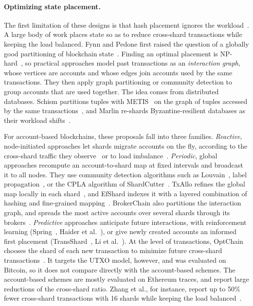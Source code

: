 \paragraph{Optimizing state placement.}
The first limitation of these designs is that hash placement ignores the workload~\cite{krol2021shard}.
A large body of work places state so as to reduce cross-shard transactions while keeping the load balanced.
Fynn and Pedone first raised the question of a globally good partitioning of blockchain state~\cite{fynn2018challenges}.
Finding an optimal placement is NP-hard~\cite{mizrahi2020blockchain}, so practical approaches model past transactions as an \emph{interaction graph}, whose vertices are accounts and whose edges join accounts used by the same transactions.
They then apply graph partitioning or community detection to group accounts that are used together.
The idea comes from distributed databases.
Schism partitions tuples with METIS~\cite{karypis1998fast} on the graph of tuples accessed by the same transactions~\cite{curino2010schism}, and Marlin re-shards Byzantine-resilient databases as their workload shifts~\cite{mehta2025adaptive}.

For account-based blockchains, these proposals fall into three families.
\emph{Reactive}, node-initiated approaches let shards migrate accounts on the fly, according to the cross-shard traffic they observe~\cite{mizrahi2020blockchain,krol2021shard} or to load imbalance~\cite{toulouse2022distributed}.
\emph{Periodic}, global approaches recompute an account-to-shard map at fixed intervals and broadcast it to all nodes.
They use community detection algorithms such as Louvain~\cite{blondel2008fast,zhang2022community}, label propagation~\cite{li2022achieving}, or the CPLA algorithm of ShardCutter~\cite{huang2026shardcutter}.
TxAllo refines the global map locally in each shard~\cite{txallo}, and EfShard indexes it with a layered combination of hashing and fine-grained mapping~\cite{efShard}.
BrokerChain also partitions the interaction graph, and spreads the most active accounts over several shards through its brokers~\cite{huang2022brokerchain}.
\emph{Predictive} approaches anticipate future interactions, with reinforcement learning (Spring~\cite{li2024spring}, Haider et al.~\cite{haider2025ai}), or give newly created accounts an informed first placement (TransShard~\cite{wang2024transshard}, Li et al.~\cite{li2025novel}).
At the level of transactions, OptChain chooses the shard of each new transaction to minimize future cross-shard transactions~\cite{Nguyen2019}.
It targets the UTXO model, however, and was evaluated on Bitcoin, so it does not compare directly with the account-based schemes. 
The account-based schemes are mostly evaluated on Ethereum traces, and report large reductions of the cross-shard ratio.
Zhang et al., for instance, report up to 50\% fewer cross-shard transactions with 16 shards while keeping the load balanced~\cite{zhang2022community}. 

